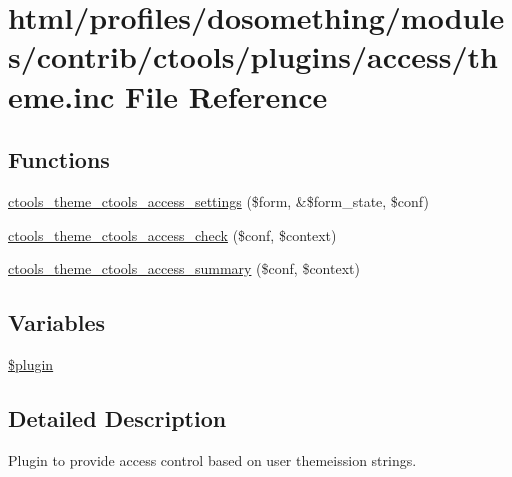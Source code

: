 \hypertarget{profiles_2dosomething_2modules_2contrib_2ctools_2plugins_2access_2theme_8inc}{
\section{html/profiles/dosomething/modules/contrib/ctools/plugins/access/theme.inc File Reference}
\label{profiles_2dosomething_2modules_2contrib_2ctools_2plugins_2access_2theme_8inc}
}
\subsection*{Functions}
\begin{DoxyCompactItemize}
\item 
\hyperlink{profiles_2dosomething_2modules_2contrib_2ctools_2plugins_2access_2theme_8inc_a7cae29c0d6f17e425b3ef4beaf216642}{ctools\_\-theme\_\-ctools\_\-access\_\-settings} (\$form, \&\$form\_\-state, \$conf)
\item 
\hyperlink{profiles_2dosomething_2modules_2contrib_2ctools_2plugins_2access_2theme_8inc_ad933255384d9eb5379800d342568a639}{ctools\_\-theme\_\-ctools\_\-access\_\-check} (\$conf, \$context)
\item 
\hyperlink{profiles_2dosomething_2modules_2contrib_2ctools_2plugins_2access_2theme_8inc_a84b5a26f3810000d996117a936fd5737}{ctools\_\-theme\_\-ctools\_\-access\_\-summary} (\$conf, \$context)
\end{DoxyCompactItemize}
\subsection*{Variables}
\begin{DoxyCompactItemize}
\item 
\hyperlink{profiles_2dosomething_2modules_2contrib_2ctools_2plugins_2access_2theme_8inc_ada8a7130088351710bb02ed622d6bf65}{\$plugin}
\end{DoxyCompactItemize}


\subsection{Detailed Description}
Plugin to provide access control based on user themeission strings. 

